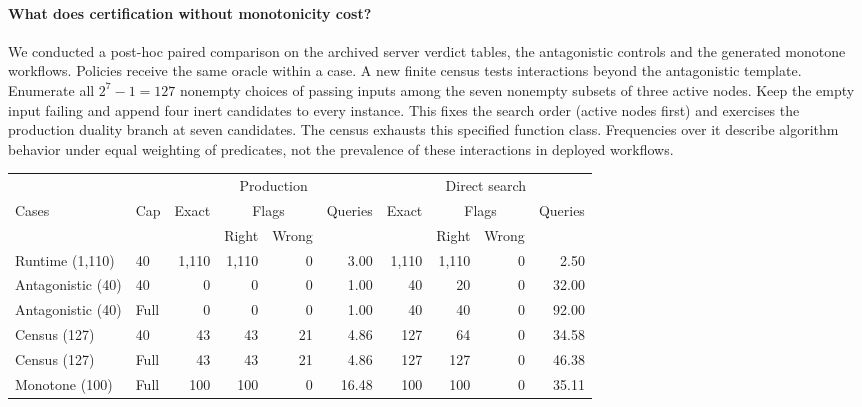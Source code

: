 \documentclass[11pt,letterpaper]{article}
\begin{document}
\paragraph{What does certification without monotonicity cost?}
We conducted a post-hoc paired comparison on the archived server verdict tables, the antagonistic controls and the generated monotone workflows. Policies receive the same oracle within a case. A new finite census tests interactions beyond the antagonistic template. Enumerate all $2^7-1=127$ nonempty choices of passing inputs among the seven nonempty subsets of three active nodes. Keep the empty input failing and append four inert candidates to every instance. This fixes the search order (active nodes first) and exercises the production duality branch at seven candidates. The census exhausts this specified function class. Frequencies over it describe algorithm behavior under equal weighting of predicates, not the prevalence of these interactions in deployed workflows.

\begin{center}\begin{minipage}{\linewidth}\centering
{}\label{tab:direct}
\small\setlength{\tabcolsep}{4pt}
\begin{tabular}{@{}llrrrrrrrr@{}}\toprule
 & & \multicolumn{4}{c}{Production} & \multicolumn{4}{c}{Direct search}\\
\cmidrule(lr){3-6}\cmidrule(l){7-10}
Cases & Cap & Exact & \multicolumn{2}{c}{Flags} & Queries & Exact & \multicolumn{2}{c}{Flags} & Queries\\
 & & & Right & Wrong & & & Right & Wrong & \\\midrule
Runtime (1,110) & 40 & 1,110 & 1,110 & 0 & 3.00 & 1,110 & 1,110 & 0 & 2.50\\
Antagonistic (40) & 40 & 0 & 0 & 0 & 1.00 & 40 & 20 & 0 & 32.00\\
Antagonistic (40) & Full & 0 & 0 & 0 & 1.00 & 40 & 40 & 0 & 92.00\\
Census (127) & 40 & 43 & 43 & 21 & 4.86 & 127 & 64 & 0 & 34.58\\
Census (127) & Full & 43 & 43 & 21 & 4.86 & 127 & 127 & 0 & 46.38\\
Monotone (100) & Full & 100 & 100 & 0 & 16.48 & 100 & 100 & 0 & 35.11\\
\bottomrule\end{tabular}\end{minipage}\end{center}
\end{document}
